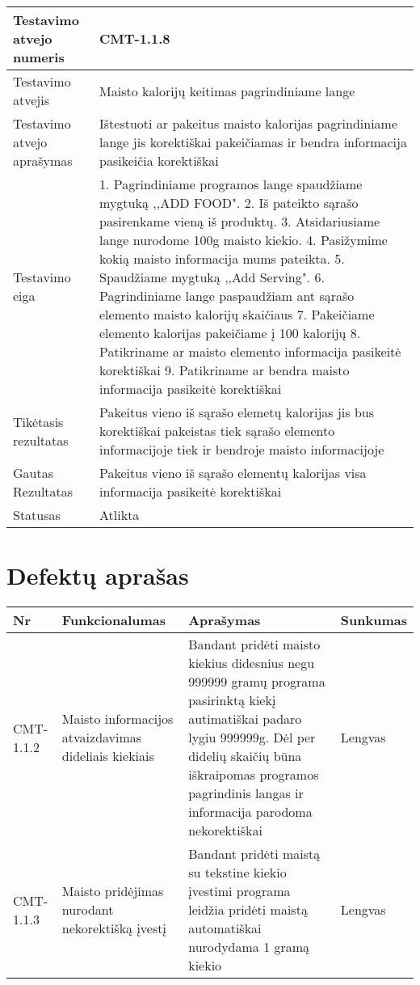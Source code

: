 \documentclass[oneside]{VUMIFPSkursinis}
\begin{document}
\begin{center}
    \begin{tabular}{ |p{5cm}|p{13cm}|}
    \hline
        Testavimo atvejo numeris & CMT-1.1.8  \\ \hline
        Testavimo atvejis & Maisto kalorijų keitimas pagrindiniame lange \\ \hline
        Testavimo atvejo aprašymas & Ištestuoti ar pakeitus maisto kalorijas pagrindiniame lange jis korektiškai pakeičiamas ir bendra informacija pasikeičia korektiškai \\ \hline
        Testavimo eiga &  1. Pagrindiniame programos lange spaudžiame mygtuką ,,ADD FOOD". 
				2. Iš pateikto sąrašo pasirenkame vieną iš produktų. 
				3. Atsidariusiame lange nurodome 100g maisto kiekio.
				4. Pasižymime kokią maisto informacija mums pateikta. 
				5. Spaudžiame mygtuką ,,Add Serving".
				6. Pagrindiniame lange paspaudžiam ant sąrašo elemento maisto kalorijų skaičiaus
				7. Pakeičiame elemento kalorijas pakeičiame į 100 kalorijų
				8. Patikriname ar maisto elemento informacija pasikeitė korektiškai
				9. Patikriname ar bendra maisto informacija pasikeitė korektiškai\\ \hline
        Tikėtasis rezultatas &  Pakeitus vieno iš sąrašo elemetų kalorijas jis bus korektiškai pakeistas tiek sąrašo elemento informacijoje tiek ir bendroje maisto informacijoje \\ \hline
        Gautas Rezultatas & Pakeitus vieno iš sąrašo elementų kalorijas visa informacija pasikeitė korektiškai \\ \hline
        Statusas &  Atlikta\\ \hline
    \hline
    \end{tabular}
\end{center}

\iffalse XXXXXXXXXXXXXXXXXXXXXXXXXXXXXXXXXXXXXXXXXXXXXXXXXXXXXXXXXXXXXXXXXXXXXXXXXXXXXXXXXXXXXXXXXXXXXXXXXXXXXXXXXXXXXXXXXXXXXXXXXXXXXXXXXXXXXXX \fi

\section{Defektų aprašas}
\begin{center}
    \begin{tabular}{ |p{1cm}| p{7cm} | p{7cm} | p{2cm} |}
    \hline
    Nr &  Funkcionalumas & Aprašymas & Sunkumas \\ \hline
    CMT-1.1.2 & Maisto informacijos atvaizdavimas dideliais kiekiais & Bandant pridėti maisto kiekius didesnius negu 999999 gramų programa pasirinktą kiekį autimatiškai padaro lygiu 999999g. Dėl per didelių skaičių būna iškraipomas programos pagrindinis langas ir informacija parodoma nekorektiškai & Lengvas \\ \hline
    CMT-1.1.3 & Maisto pridėjimas nurodant nekorektišką įvestį & Bandant pridėti maistą su tekstine kiekio įvestimi programa leidžia pridėti maistą automatiškai nurodydama 1 gramą kiekio & Lengvas \\ \hline


    \hline
    \end{tabular}
\end{center}


	
\end{document}
